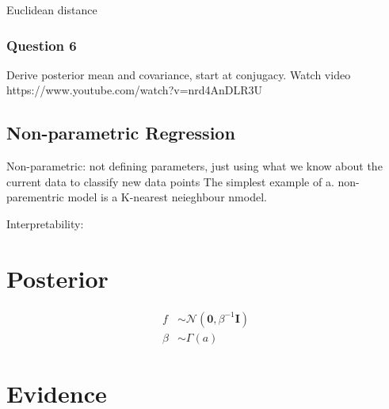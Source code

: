 \documentclass[10pt, a4paper, twocolumn]{article} %
\begin{document}
Euclidean distance

\subsubsection*{Question 6}

Derive posterior mean and covariance, start at conjugacy. Watch video https://www.youtube.com/watch?v=nrd4AnDLR3U

\subsection{Non-parametric Regression}

Non-parametric: not defining parameters, just using what we know about the current data to classify new data points
The simplest example of a. non-parementric model is a K-nearest neieghbour nmodel.

Interpretability: 

\section{Posterior}

\begin{align}
  f &\sim \mathcal{N}\left(\boldsymbol{0},\beta^{-1}\mathbf{I}\right)\\
  \beta &\sim \Gamma(a)
\end{align}

\section{Evidence}


\printbibliography[title={Bibliography}] %

\end{document}
